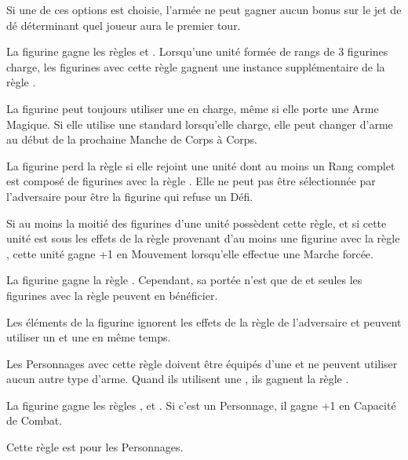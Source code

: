 Si une de ces options est choisie, l'armée ne peut gagner aucun bonus sur le jet de dé déterminant quel joueur aura le premier tour. 
 
\armyspecialruleentry{\lanceformation}

La figurine gagne les règles \monstrousranks{} et \fightinextrarank{}. Lorsqu'une unité formée de rangs de 3 figurines charge, les figurines avec cette règle gagnent une instance supplémentaire de la règle \fightinextrarank{}. 

\armyspecialruleentry{\jousting}

La figurine peut toujours utiliser une \lance{} en charge, même si elle porte une Arme Magique. Si elle utilise une \lance{} standard lorsqu'elle charge, elle peut changer d'arme au début de la prochaine Manche de Corps à Corps.

\armyspecialruleentry{\beloved}

La figurine perd la règle \firstinrank{} si elle rejoint une unité dont au moins un Rang complet est composé de figurines avec la règle \lanceformation{}. Elle ne peut pas être sélectionnée par l'adversaire pour être la figurine qui refuse un Défi.

\armyspecialruleentry{\serfs}

Si au moins la moitié des figurines d'une unité possèdent cette règle, et si cette unité est sous les effets de la règle \inspiringpresence{} provenant d'au moins une figurine avec la règle \oathoffealty{}, cette unité gagne +1 en Mouvement lorsqu'elle effectue une Marche forcée.

\armyspecialruleentry{\oathoffealty}

La figurine gagne la règle \inspiringpresence{}. Cependant, sa portée n'est que de  et seules les figurines avec la règle \serfs{} peuvent en bénéficier.

\setlength{\columnseprule}{0.5pt}
\renewcommand{\columnseprulecolor}{\color{black!30}}
\begin{multicols}{2}\raggedcolumns
\armyspecialruleentry{\questingoath}

Les éléments de la figurine ignorent les effets de la règle \fear{} de l'adversaire et peuvent utiliser un \shield{} et une \gw{} en même temps.

\vspace*{5pt}
Les Personnages avec cette règle doivent être équipés d'une \gw{} et ne peuvent utiliser aucun autre type d'arme. Quand ils utilisent une \gw{}, ils gagnent la règle .

\columnbreak
\armyspecialruleentry{\grailoath}

La figurine gagne les règles \magicalattacks{}, \immunetopsychology{} et . Si c'est un Personnage, il gagne +1 en Capacité de Combat.

\vspace*{5pt}
Cette règle est \oneofakind{} pour les Personnages.
\end{multicols}
\setlength{\columnseprule}{0pt}


